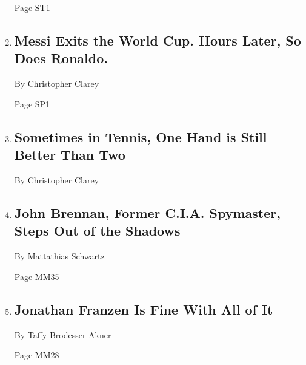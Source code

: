 \begin{enumerate}
  Page ST1
\item
  \href{/2018/06/30/sports/world-cup/argentina-vs-france.html}{}

  \hypertarget{messi-exits-the-world-cup-hours-later-so-does-ronaldo}{%
  \subsection{Messi Exits the World Cup. Hours Later, So Does
  Ronaldo.}\label{messi-exits-the-world-cup-hours-later-so-does-ronaldo}}

  By Christopher Clarey

  Page SP1
\item
  \href{/2018/06/30/sports/tennis/one-handed-backhand.html}{}

  \hypertarget{sometimes-in-tennis-one-hand-is-still-better-than-two}{%
  \subsection{Sometimes in Tennis, One Hand is Still Better Than
  Two}\label{sometimes-in-tennis-one-hand-is-still-better-than-two}}

  By Christopher Clarey
\item
  \href{/2018/06/27/magazine/john-brennan-president-trump-national-security-state.html}{}

  \hypertarget{john-brennan-former-cia-spymaster-steps-out-of-the-shadows}{%
  \subsection{John Brennan, Former C.I.A. Spymaster, Steps Out of the
  Shadows}\label{john-brennan-former-cia-spymaster-steps-out-of-the-shadows}}

  By Mattathias Schwartz

  Page MM35
\item
  \href{/2018/06/26/magazine/jonathan-franzen-is-fine-with-all-of-it.html}{}

  \hypertarget{jonathan-franzen-is-fine-with-all-of-it}{%
  \subsection{Jonathan Franzen Is Fine With All of
  It}\label{jonathan-franzen-is-fine-with-all-of-it}}

  By Taffy Brodesser-Akner

  Page MM28
\end{enumerate}

